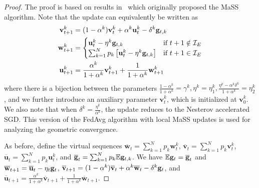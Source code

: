\begin{proof}
	
	The proof is based on results in~\cite{liu2018accelerating} which originally proposed the MaSS algorithm. Note that the update can equivalently be written as 
	\begin{align*}
	\mathbf{v}_{t+1}^{k} & =(1-\alpha^{k})\mathbf{v}_{t}^{k}+\alpha^{k}\mathbf{u}_{t}^{k}-\delta^{k}{\mathbf{g}}_{t,k}\\
	\mathbf{w}_{t+1}^{k} & =\begin{cases}
	\mathbf{u}_{t}^{k}-\eta^{k}{\mathbf{g}}_{t,k} & \text{if }t+1\notin\mathcal{I}_{E}\\
	\sum_{k=1}^{N}p_{k}\left[\mathbf{u}_{t}^{k}-\eta^{k}{\mathbf{g}}_{t,k}\right] & \text{if }t+1\in\mathcal{I}_{E}
	\end{cases}\\
	\mathbf{u}_{t+1}^{k} & =\frac{\alpha^{k}}{1+\alpha^{k}}\mathbf{v}_{t+1}^{k}+\frac{1}{1+\alpha^{k}}\mathbf{w}_{t+1}^{k}
	\end{align*}
	where there is a bijection between the parameters $\frac{1-\alpha^{k}}{1+\alpha^{k}}=\gamma^{k},\eta^{k}=\eta_{1}^{k},\frac{\eta^{k}-\alpha^{k}\delta^{k}}{1+\alpha^{k}}=\eta_{2}^{k}$,
	and we further introduce an auxiliary parameter $\mathbf{v}_{t}^{k}$,
	which is initialized at $\mathbf{v}_{0}^{k}$. We also note that when
	$\delta^{k}=\frac{\eta^{k}}{\alpha^{k}}$, the update reduces to the
	Nesterov accelerated SGD. This version of the FedAvg algorithm with
	local MaSS updates is used for analyzing the geometric convergence. 
	
	As before, define the virtual sequences $\overline{\mathbf{w}}_{t}=\sum_{k=1}^{N}p_{k}\mathbf{w}_{t}^{k}$,
	$\overline{\mathbf{v}}_{t}=\sum_{k=1}^{N}p_{k}\mathbf{v}_{t}^{k}$,
	$\overline{\mathbf{u}}_{t}=\sum_{k=1}^{N}p_{k}\mathbf{u}_{t}^{k}$,
	and ${\overline{\mathbf{g}}}_{t}=\sum_{k=1}^{N}p_{k}\mathbb{E}{\mathbf{g}}_{t,k}$. We have
	$\mathbb{E}{\mathbf{g}}_{t}={\overline{\mathbf{g}}}_{t}$ and $\overline{\mathbf{w}}_{t+1}=\overline{\mathbf{u}}_{t}-\eta_{t}{\mathbf{g}}_{t}$,
	$\overline{\mathbf{v}}_{t+1}=(1-\alpha^{k})\overline{\mathbf{v}}_{t}+\alpha^{k}\overline{\mathbf{w}}_{t}-\delta^{k}{\mathbf{g}}_{t}$,
	and $\overline{\mathbf{u}}_{t+1}=\frac{\alpha^{k}}{1+\alpha^{k}}\overline{\mathbf{v}}_{t+1}+\frac{1}{1+\alpha^{k}}\overline{\mathbf{w}}_{t+1}$.
	

\end{proof}
